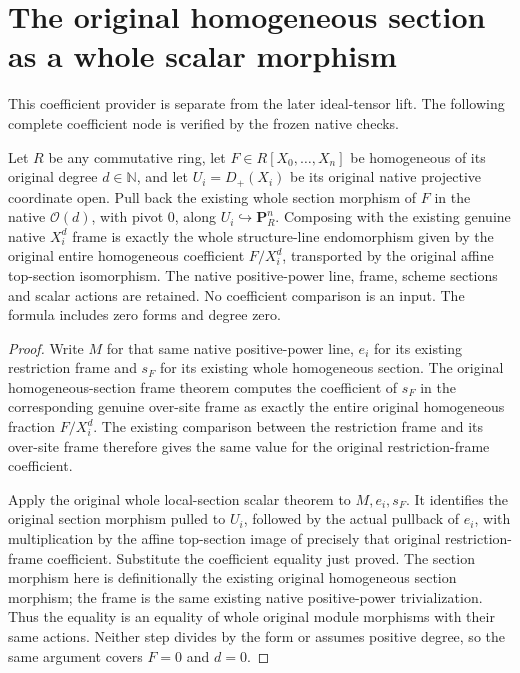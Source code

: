 \section{The original homogeneous section as a whole scalar morphism}

This coefficient provider is separate from the later ideal-tensor lift.
The following complete coefficient node is verified by the frozen native checks.

\begin{lemma}
\label{lem:resume-original-homogeneous-whole-scalar}
\leanok
Let $R$ be any commutative ring, let $F\in R[X_0,\ldots,X_n]$ be
homogeneous of its original degree $d\in\mathbb N$, and let $U_i=D_+(X_i)$
be its original native projective coordinate open.  Pull back the existing
whole section morphism of $F$ in the native $\mathcal O(d)$, with pivot
$0$, along $U_i\hookrightarrow\mathbf P_R^n$.  Composing with the
existing genuine native $X_i^d$ frame is exactly the whole structure-line
endomorphism given by the original entire homogeneous coefficient
$F/X_i^d$, transported by the original affine top-section isomorphism.
The native positive-power line, frame, scheme sections and scalar actions
are retained.  No coefficient comparison is an input.  The formula includes
zero forms and degree zero.
\end{lemma}
\begin{proof}
Write $M$ for that same native positive-power line, $e_i$ for its existing
restriction frame and $s_F$ for its existing whole homogeneous section.
The original homogeneous-section frame theorem computes the coefficient
of $s_F$ in the corresponding genuine over-site frame as exactly the
entire original homogeneous fraction $F/X_i^d$.  The existing comparison
between the restriction frame and its over-site frame therefore gives the
same value for the original restriction-frame coefficient.

Apply the original whole local-section scalar theorem to $M,e_i,s_F$.
It identifies the original section morphism pulled to $U_i$, followed by
the actual pullback of $e_i$, with multiplication by the affine top-section
image of precisely that original restriction-frame coefficient.  Substitute
the coefficient equality just proved.  The section morphism here is
definitionally the existing original homogeneous section morphism; the
frame is the same existing native positive-power trivialization.  Thus the
equality is an equality of whole original module morphisms with their same
actions.  Neither step divides by the form or assumes positive degree, so
the same argument covers $F=0$ and $d=0$.
\end{proof}
